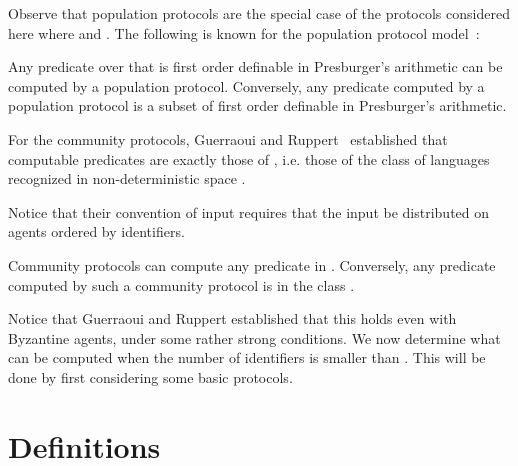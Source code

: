 \documentclass[UKenglish]{llncs}
\begin{document}
Observe that  population protocols 
\cite{angluin2007cpp,AspnesADFP2004} are the special case  of the
protocols considered here where  and .
The following is known for the population protocol model~\cite{angluin2007cpp,AspnesADFP2004}: 

\begin{theorem}
Any predicate over  that is first order definable in
Presburger's arithmetic can be computed by a population protocol.
Conversely, 
any predicate computed by a population protocol is a subset of
 first order definable in
Presburger's arithmetic.
\end{theorem}










For the community protocols, Guerraoui and Ruppert~\cite{guerraoui2009names} 
established     that computable predicates
are exactly those of , i.e. those of  the class
  of languages recognized in non-deterministic space .


Notice that their
convention \cite{guerraoui2009names}  of input   requires that the input be distributed on agents ordered by
identifiers. 







\begin{theorem} \label{th:eux}
Community protocols can compute  any predicate in . 
Conversely, any predicate computed by such a 
community protocol is in the class .
\end{theorem}

Notice that Guerraoui and Ruppert \cite{guerraoui2009names}
established that this holds even with Byzantine agents, under some
rather strong conditions.  We now determine what can be computed when
the number of identifiers  is smaller than . This will be
done by first considering some basic protocols.




\section{Definitions}
\label{sec:3}
\end{document}
